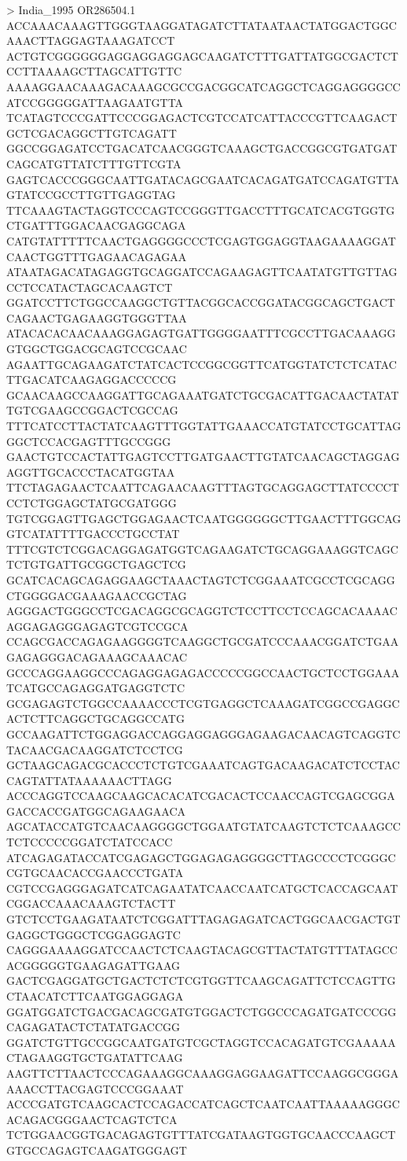 > India_1995 OR286504.1
ACCAAACAAAGTTGGGTAAGGATAGATCTTATAATAACTATGGACTGGCAAACTTAGGAGTAAAGATCCT
ACTGTCGGGGGGAGGAGGAGGAGCAAGATCTTTGATTATGGCGACTCTCCTTAAAAGCTTAGCATTGTTC
AAAAGGAACAAAGACAAAGCGCCGACGGCATCAGGCTCAGGAGGGGCCATCCGGGGGATTAAGAATGTTA
TCATAGTCCCGATTCCCGGAGACTCGTCCATCATTACCCGTTCAAGACTGCTCGACAGGCTTGTCAGATT
GGCCGGAGATCCTGACATCAACGGGTCAAAGCTGACCGGCGTGATGATCAGCATGTTATCTTTGTTCGTA
GAGTCACCCGGGCAATTGATACAGCGAATCACAGATGATCCAGATGTTAGTATCCGCCTTGTTGAGGTAG
TTCAAAGTACTAGGTCCCAGTCCGGGTTGACCTTTGCATCACGTGGTGCTGATTTGGACAACGAGGCAGA
CATGTATTTTTCAACTGAGGGGCCCTCGAGTGGAGGTAAGAAAAGGATCAACTGGTTTGAGAACAGAGAA
ATAATAGACATAGAGGTGCAGGATCCAGAAGAGTTCAATATGTTGTTAGCCTCCATACTAGCACAAGTCT
GGATCCTTCTGGCCAAGGCTGTTACGGCACCGGATACGGCAGCTGACTCAGAACTGAGAAGGTGGGTTAA
ATACACACAACAAAGGAGAGTGATTGGGGAATTTCGCCTTGACAAAGGGTGGCTGGACGCAGTCCGCAAC
AGAATTGCAGAAGATCTATCACTCCGGCGGTTCATGGTATCTCTCATACTTGACATCAAGAGGACCCCCG
GCAACAAGCCAAGGATTGCAGAAATGATCTGCGACATTGACAACTATATTGTCGAAGCCGGACTCGCCAG
TTTCATCCTTACTATCAAGTTTGGTATTGAAACCATGTATCCTGCATTAGGGCTCCACGAGTTTGCCGGG
GAACTGTCCACTATTGAGTCCTTGATGAACTTGTATCAACAGCTAGGAGAGGTTGCACCCTACATGGTAA
TTCTAGAGAACTCAATTCAGAACAAGTTTAGTGCAGGAGCTTATCCCCTCCTCTGGAGCTATGCGATGGG
TGTCGGAGTTGAGCTGGAGAACTCAATGGGGGGCTTGAACTTTGGCAGGTCATATTTTGACCCTGCCTAT
TTTCGTCTCGGACAGGAGATGGTCAGAAGATCTGCAGGAAAGGTCAGCTCTGTGATTGCGGCTGAGCTCG
GCATCACAGCAGAGGAAGCTAAACTAGTCTCGGAAATCGCCTCGCAGGCTGGGGACGAAAGAACCGCTAG
AGGGACTGGGCCTCGACAGGCGCAGGTCTCCTTCCTCCAGCACAAAACAGGAGAGGGAGAGTCGTCCGCA
CCAGCGACCAGAGAAGGGGTCAAGGCTGCGATCCCAAACGGATCTGAAGAGAGGGACAGAAAGCAAACAC
GCCCAGGAAGGCCCAGAGGAGAGACCCCCGGCCAACTGCTCCTGGAAATCATGCCAGAGGATGAGGTCTC
GCGAGAGTCTGGCCAAAACCCTCGTGAGGCTCAAAGATCGGCCGAGGCACTCTTCAGGCTGCAGGCCATG
GCCAAGATTCTGGAGGACCAGGAGGAGGGAGAAGACAACAGTCAGGTCTACAACGACAAGGATCTCCTCG
GCTAAGCAGACGCACCCTCTGTCGAAATCAGTGACAAGACATCTCCTACCAGTATTATAAAAAACTTAGG
ACCCAGGTCCAAGCAAGCACACATCGACACTCCAACCAGTCGAGCGGAGACCACCGATGGCAGAAGAACA
AGCATACCATGTCAACAAGGGGCTGGAATGTATCAAGTCTCTCAAAGCCTCTCCCCCGGATCTATCCACC
ATCAGAGATACCATCGAGAGCTGGAGAGAGGGGCTTAGCCCCTCGGGCCGTGCAACACCGAACCCTGATA
CGTCCGAGGGAGATCATCAGAATATCAACCAATCATGCTCACCAGCAATCGGACCAAACAAAGTCTACTT
GTCTCCTGAAGATAATCTCGGATTTAGAGAGATCACTGGCAACGACTGTGAGGCTGGGCTCGGAGGAGTC
CAGGGAAAAGGATCCAACTCTCAAGTACAGCGTTACTATGTTTATAGCCACGGGGGTGAAGAGATTGAAG
GACTCGAGGATGCTGACTCTCTCGTGGTTCAAGCAGATTCTCCAGTTGCTAACATCTTCAATGGAGGAGA
GGATGGATCTGACGACAGCGATGTGGACTCTGGCCCAGATGATCCCGGCAGAGATACTCTATATGACCGG
GGATCTGTTGCCGGCAATGATGTCGCTAGGTCCACAGATGTCGAAAAACTAGAAGGTGCTGATATTCAAG
AAGTTCTTAACTCCCAGAAAGGCAAAGGAGGAAGATTCCAAGGCGGGAAAACCTTACGAGTCCCGGAAAT
ACCCGATGTCAAGCACTCCAGACCATCAGCTCAATCAATTAAAAAGGGCACAGACGGGAACTCAGTCTCA
TCTGGAACGGTGACAGAGTGTTTATCGATAAGTGGTGCAACCCAAGCTGTGCCAGAGTCAAGATGGGAGT
